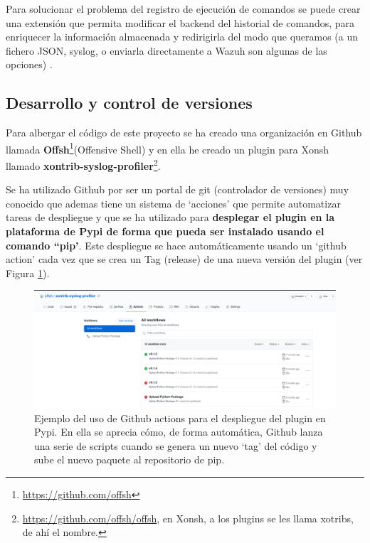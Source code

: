 Para solucionar el problema del registro de ejecución de comandos se puede crear una extensión que permita modificar el backend del historial de comandos, para enriquecer la información almacenada y redirigirla del modo que queramos (a un fichero JSON, syslog, o enviarla directamente a Wazuh son algunas de las opciones) \cite{prompttoolkit}\cite{Xonshdocs}.

\subsection{Desarrollo y control de versiones}

Para albergar el código de este proyecto se ha creado una organización en Github llamada \textbf{Offsh}\footnote{\url{https://github.com/offsh}}(Offensive Shell) y en ella he creado un plugin para Xonsh llamado \textbf{xontrib-syslog-profiler}\footnote{\url{https://github.com/offsh/offsh}, en Xonsh, a los plugins se les llama xotribs, de ahí el nombre.}. 

Se ha utilizado Github por ser un portal de git (controlador de versiones) muy conocido que ademas tiene un sistema de `acciones' que permite automatizar tareas de despliegue y que se ha utilizado para \textbf{desplegar el plugin en la plataforma de Pypi de forma que pueda ser instalado usando el comando ``pip'}. Este despliegue se hace automáticamente usando un `github action' cada vez que se crea un Tag (release) de una nueva versión del plugin (ver Figura \ref{githubactions}).

\begin{figure}
  \centering
  \includegraphics[width=\textwidth]{imagenes/githubactions.png}
  \caption{Ejemplo del uso de Github actions para el despliegue del plugin en Pypi. En ella se aprecia cómo, de forma automática, Github lanza una serie de scripts cuando se genera un nuevo `tag' del código y sube el nuevo paquete al repositorio de pip.}
  \label{githubactions}
\end{figure}

